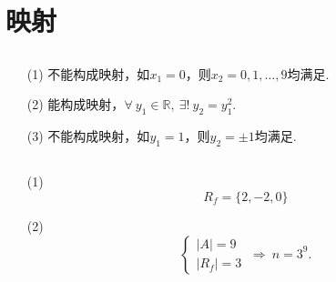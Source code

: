 \documentclass[UTF8]{ctexart}
\begin{document}
\fancyfoot[C]{\thepage}

\section{映射}
\subsection{}   %
\begin{enumerate}
    \item [(1)]不能构成映射，如$x_1=0$，则$x_2=0,1,\ldots,9$均满足.
    \item [(2)]能构成映射，$\forall\ y_1\in \mathbb{R},\ \exists !\ y_2 = y_1^2$.
    \item [(3)]不能构成映射，如$y_1 = 1$，则$y_2 = \pm 1$均满足.
\end{enumerate}

\subsection{}   %
\begin{enumerate}
    \item [(1)]
    \[
        R_f = \{ 2 , -2 , 0 \}    
    \]
    \item [(2)]
    \[
        \begin{cases}
            |A| = 9\\
            |R_f| = 3
        \end{cases}    
        \ \Rightarrow\ 
        n = 3^9.
    \]
\end{enumerate}
\end{document}
